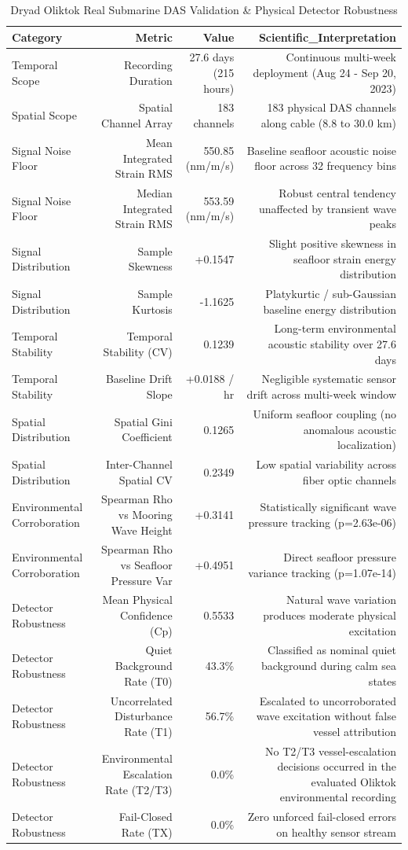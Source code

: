 \begin{table}[htbp]
\centering
\caption{Dryad Oliktok Real Submarine DAS Validation & Physical Detector Robustness}
\begin{tabular}{lrrr}
\toprule
Category & Metric & Value & Scientific\_Interpretation \\
\midrule
Temporal Scope & Recording Duration & 27.6 days (215 hours) & Continuous multi-week deployment (Aug 24 - Sep 20, 2023) \\
Spatial Scope & Spatial Channel Array & 183 channels & 183 physical DAS channels along cable (8.8 to 30.0 km) \\
Signal Noise Floor & Mean Integrated Strain RMS & 550.85 (nm/m/s) & Baseline seafloor acoustic noise floor across 32 frequency bins \\
Signal Noise Floor & Median Integrated Strain RMS & 553.59 (nm/m/s) & Robust central tendency unaffected by transient wave peaks \\
Signal Distribution & Sample Skewness & +0.1547 & Slight positive skewness in seafloor strain energy distribution \\
Signal Distribution & Sample Kurtosis & -1.1625 & Platykurtic / sub-Gaussian baseline energy distribution \\
Temporal Stability & Temporal Stability (CV) & 0.1239 & Long-term environmental acoustic stability over 27.6 days \\
Temporal Stability & Baseline Drift Slope & +0.0188 / hr & Negligible systematic sensor drift across multi-week window \\
Spatial Distribution & Spatial Gini Coefficient & 0.1265 & Uniform seafloor coupling (no anomalous acoustic localization) \\
Spatial Distribution & Inter-Channel Spatial CV & 0.2349 & Low spatial variability across fiber optic channels \\
Environmental Corroboration & Spearman Rho vs Mooring Wave Height & +0.3141 & Statistically significant wave pressure tracking (p=2.63e-06) \\
Environmental Corroboration & Spearman Rho vs Seafloor Pressure Var & +0.4951 & Direct seafloor pressure variance tracking (p=1.07e-14) \\
Detector Robustness & Mean Physical Confidence (Cp) & 0.5533 & Natural wave variation produces moderate physical excitation \\
Detector Robustness & Quiet Background Rate (T0) & 43.3\% & Classified as nominal quiet background during calm sea states \\
Detector Robustness & Uncorrelated Disturbance Rate (T1) & 56.7\% & Escalated to uncorroborated wave excitation without false vessel attribution \\
Detector Robustness & Environmental Escalation Rate (T2/T3) & 0.0\% & No T2/T3 vessel-escalation decisions occurred in the evaluated Oliktok environmental recording \\
Detector Robustness & Fail-Closed Rate (TX) & 0.0\% & Zero unforced fail-closed errors on healthy sensor stream \\
\bottomrule
\end{tabular}
\end{table}
